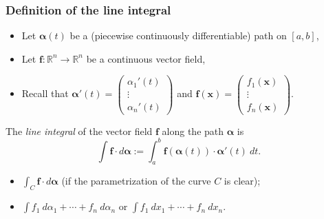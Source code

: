 \documentclass[aspectratio=169,handout]{beamer}
\newcommand{\bR}{\mathbb{R}} %
\newcommand{\ff}{\mathbf{f}}
\newcommand{\xx}{\mathbf{x}}
\newcommand{\aalpha}{\boldsymbol{\alpha}}
\begin{document}
\begin{frame}
    \frametitle{Definition of the line integral}

    \begin{itemize}
        \item Let \(\aalpha(t)\) be a (piecewise continuously differentiable) path on \([a,b]\),
        \item Let \(\ff: \bR^n\to\bR^n\) be a continuous vector field,
        \item Recall that \(\aalpha'(t) = \begin{pmatrix}
                  \alpha_1'(t) \\ \vdots \\ \alpha_n'(t)
              \end{pmatrix}\)
              and \(\ff(\xx) = \begin{pmatrix}
                  f_1(\xx) \\ \vdots \\ f_n(\xx)
              \end{pmatrix}\).
    \end{itemize}
    \begin{definition}
        The \emph{line integral} of the vector field \(\ff\) along the path \(\aalpha\) is
        \[
            \int \ff \cdot d\aalpha := \int_{a}^{b} \ff(\aalpha(t)) \cdot \aalpha'(t) \ dt.
        \]
    \end{definition}

    \begin{itemize}
        \item  \(\int_C \ff \cdot d\aalpha  \) (if the parametrization of the curve \(C\) is clear);
        \item \(\int f_1 \ d\alpha_1 + \cdots + f_n \ d\alpha_n\) or \(\int f_1 \ dx_1 + \cdots + f_n \ dx_n\).
    \end{itemize}


\end{frame}
\end{document}
